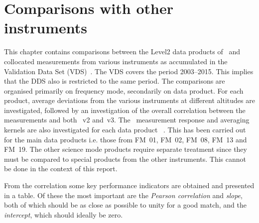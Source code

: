 \chapter{Comparisons with other instruments}
\label{chapter:comparisons}
This chapter contains comparisons between the Level2 data products of \smr\ and
collocated measurements from various instruments as accumulated in the
Validation Data Set (VDS)~\cite{VDS:2016}.  The VDS covers the period
2003--2015.  This implies that the DDS also is restricted to the same period.
The comparisons are organised primarily on frequency mode, secondarily on data
product. For each product, average deviations from the various instruments at
different altitudes are investigated, followed by an investigation of the
overall correlation between the measurements and both \smr~v2 and~v3. The \smr\
measurement response and averaging kernels are also investigated for each data
product~\cite{atbdl2} .  This has been carried out for the main data products
i.e. those from FM~01, FM~02, FM~08, FM~13 and FM~19.  The other science mode
products require separate treatment since they must be compared to special
products from the other instruments. This cannot be done in the context of this
report.

From the correlation some key performance indicators are obtained and presented
in a table. Of these the most important are the \emph{Pearson correlation} and
\emph{slope}, both of which should be as close as possible to unity for a good
match, and the \emph{intercept}, which should ideally be zero.

